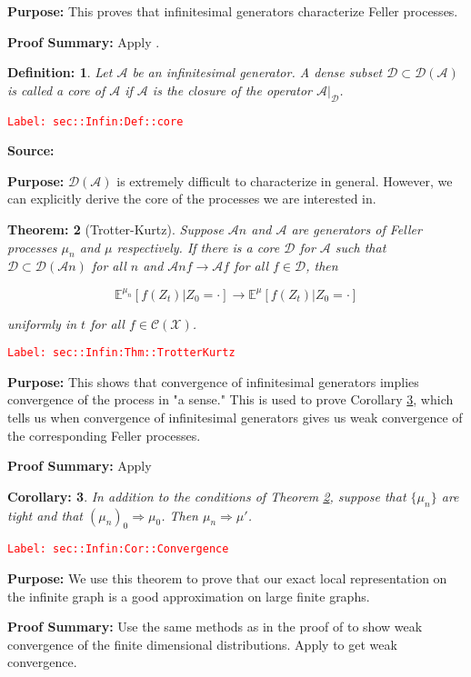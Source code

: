 \documentclass[12pt]{article}
\newcommand{\mb}{\mathbb}
\newcommand{\mc}{\mathcal}
\newcommand{\ra}{\rightarrow}
\newcommand{\tr}{\textcolor{red}}
\newcommand{\labe}[1]{\tr{\texttt{Label: #1}}}
\newcommand{\purpose}{\textbf{Purpose: }}
\newcommand{\pfsum}{\textbf{Proof Summary: }}
\newcommand{\exmu}[2]{\mb{E}^{#1}\left[#2\right]}	%
\newcommand{\IG}{\mc{A}}						%
\newcommand{\core}{\mc{D}}							%
\newtheorem{thms}{Theorem: }[section]
\newtheorem{coro}[thms]{Corollary: }
\newtheorem{defn}[thms]{Definition: }
\begin{document}
\purpose This proves that infinitesimal generators characterize Feller processes.

\pfsum Apply \cite[Theorem 1.5,2.9]{Lig85}.

\begin{defn}
Let \(\IG{}\) be an infinitesimal generator. A dense subset \(\core\subset \core(\IG{})\) is called a core of \(\IG{}\) if \(\IG{}\) is the closure of the operator \(\IG{}|_\core\).
\label{sec::Infin:Def::core}
\end{defn}
\labe{sec::Infin:Def::core}

\textbf{Source: }\cite[Definition 2.11]{Lig85}

\purpose \(\core(\IG{})\) is extremely difficult to characterize in general. However, we can explicitly derive the core of the processes we are interested in.

\begin{thms}[Trotter-Kurtz]
Suppose \(\IG{n}\) and \(\IG{}\) are generators of Feller processes \(\mu_n\) and \(\mu\) respectively. If there is a core \(\core\) for \(\IG{}\) such that \(\core \subset \mc{D}(\IG{n})\) for all \(n\) and \(\IG{n} f \ra \IG{} f\) for all \(f \in \core\), then 

\[\exmu{\mu_n}{f(Z_t)|Z_0=\cdot} \ra \exmu{\mu}{f(Z_t)|Z_0=\cdot}\]

uniformly in \(t\) for all \(f \in \mc{C}(\mc{X})\).
\label{sec::Infin:Thm::TrotterKurtz}
\end{thms}
\labe{sec::Infin:Thm::TrotterKurtz}

\purpose This shows that convergence of infinitesimal generators implies convergence of the process in "a sense." This is used to prove Corollary \ref{sec::Infin:Cor::Convergence}, which tells us when convergence of infinitesimal generators gives us weak convergence of the corresponding Feller processes.

\pfsum Apply \cite[Theorem 2.12]{Lig85}

\begin{coro}
In addition to the conditions of Theorem \ref{sec::Infin:Thm::TrotterKurtz}, suppose that \(\{\mu_n\}\) are tight and that \((\mu_n)_0 \Rightarrow \mu_0\). Then \(\mu_n \Rightarrow \mu'\).
\label{sec::Infin:Cor::Convergence}
\end{coro}
\labe{sec::Infin:Cor::Convergence}

\purpose We use this theorem to prove that our exact local representation on the infinite graph is a good approximation on large finite graphs.

\pfsum Use the same methods as in the proof of \cite[Theorem 4.2]{Kur81} to show weak convergence of the finite dimensional distributions. Apply \cite[Theorem 13.1]{Bil99} to get weak convergence.
\end{document}
